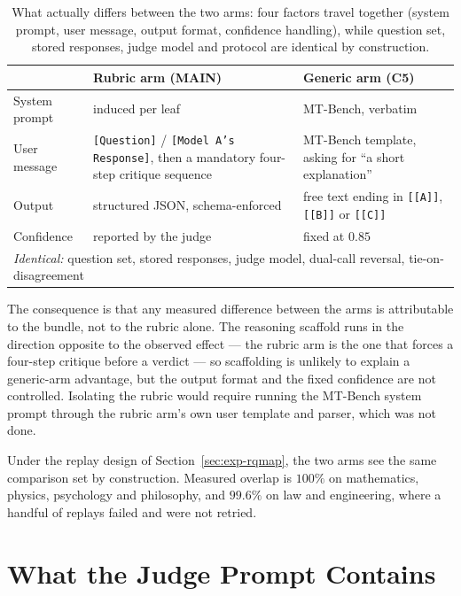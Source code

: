 \begin{table}[htbp]
\centering
\small
\caption{What actually differs between the two arms: four factors
travel together (system prompt, user message, output format,
confidence handling), while question set, stored responses, judge
model and protocol are identical by construction.}
\label{tab:arm-differences}
\begin{tabular}{p{2.6cm}p{4.6cm}p{4.6cm}}
\toprule
& Rubric arm (MAIN) & Generic arm (C5) \\
\midrule
System prompt & induced per leaf & MT-Bench, verbatim \\
User message & \texttt{[Question]} / \texttt{[Model A's Response]}, then a
mandatory four-step critique sequence & MT-Bench template, asking for ``a short
explanation'' \\
Output & structured JSON, schema-enforced & free text ending in
\texttt{[[A]]}, \texttt{[[B]]} or \texttt{[[C]]} \\
Confidence & reported by the judge & fixed at $0.85$ \\
\midrule
\multicolumn{3}{l}{\textit{Identical:} question set, stored responses, judge
model, dual-call reversal, tie-on-disagreement} \\
\bottomrule
\end{tabular}
\end{table}

The consequence is that any measured difference between the arms is attributable
to the bundle, not to the rubric alone. The reasoning scaffold runs in the
direction opposite to the observed effect --- the rubric arm is the one that
forces a four-step critique before a verdict --- so scaffolding is unlikely to
explain a generic-arm advantage, but the output format and the fixed confidence
are not controlled. Isolating the rubric would require running the MT-Bench
system prompt through the rubric arm's own user template and parser, which was
not done.

Under the replay design of Section~\ref{sec:exp-rqmap}, the two arms see the
same comparison set by construction. Measured overlap is $100\%$ on
mathematics, physics, psychology and philosophy, and $99.6\%$ on law and
engineering, where a handful of replays failed and were not retried.

\section{What the Judge Prompt Contains}\label{sec:judge-prompt-contents}

